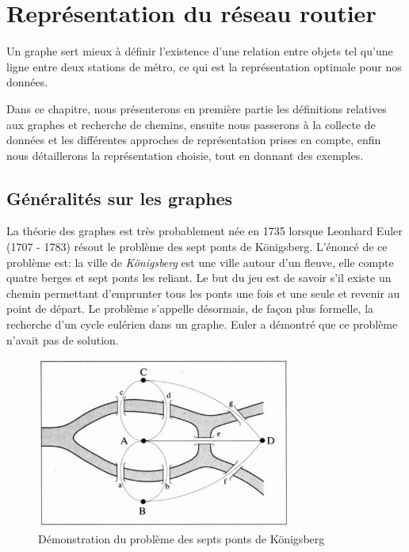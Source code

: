 \chapter{Représentation du réseau routier}
Un graphe sert mieux à définir l'existence d'une relation entre objets tel qu'une ligne entre deux stations de métro, ce qui est la représentation optimale pour nos données. 

Dans ce chapitre, nous présenterons en première partie les définitions relatives aux graphes et recherche de chemins, ensuite nous passerons à la collecte de données et les différentes approches de représentation prises en compte, enfin nous détaillerons la représentation choisie, tout en donnant des exemples.

\section{Généralités sur les graphes}
La théorie des graphes est très probablement née en 1735 lorsque Leonhard Euler (1707 - 1783) résout le problème des sept ponts de Königsberg. 
L'énoncé de ce problème est: la ville de \emph{Königsberg} est une ville autour d'un fleuve, elle compte quatre berges et sept ponts les reliant. Le but du jeu est de savoir s'il existe un chemin permettant d'emprunter tous les ponts une fois et une seule et revenir au point de départ. Le problème s'appelle désormais, de façon plus formelle, la recherche d'un cycle eulérien dans un graphe. Euler a démontré que ce problème n'avait pas de solution.

\begin{figure}[h!]
\center
\includegraphics[width=0.75\textwidth]{img/Bridges.jpg}
\caption{Démonstration du problème des septs ponts de Königsberg}
\end{figure}

